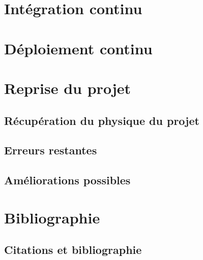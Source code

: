 \documentclass[
    iai, %
    il, %
]{heig-tb}
\begin{document}



\chapter{Intégration continu}


\chapter{Déploiement continu}

\chapter{Reprise du projet}

\section{Récupération du physique du projet}

\section{Erreurs restantes}

\section{Améliorations possibles}

\chapter{Bibliographie}
\section{Citations et bibliographie}
\end{document}
